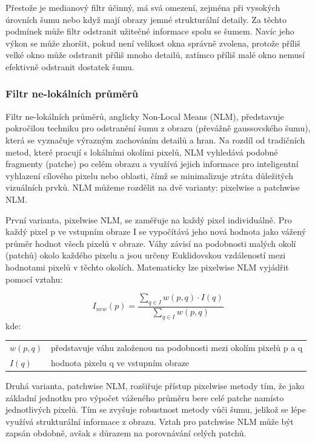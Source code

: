 \documentclass[male,czech,api_ing]{thesis}
\makeatletter
\newenvironment{conditions}[1][kde:]
    {#1 \begin{tabular}[t]{>{$}l<{$} @{${}={}$} >{\raggedright\arraybackslash}p{10cm}}}
    {\end{tabular}}
\makeatother
\begin{document}
Přestože je medianový filtr účinný, má svá omezení, zejména při vysokých úrovních šumu nebo když mají obrazy jemné strukturální detaily. Za těchto podmínek může filtr odstranit užitečné informace spolu se šumem. Navíc jeho výkon se může zhoršit, pokud není velikost okna správně zvolena, protože příliš velké okno může odstranit příliš mnoho detailů, zatímco příliš malé okno nemusí efektivně odstranit dostatek šumu.

\subsubsection{Filtr ne-lokálních průměrů}
Filtr ne-lokálních průměrů, anglicky Non-Local Means (NLM), představuje pokročilou techniku pro odstranění šumu z obrazu (převážně gaussovského šumu), která se vyznačuje výrazným zachováním detailů a hran. Na rozdíl od tradičních metod, které pracují s lokálními okolími pixelů, NLM vyhledává podobné fragmenty (patche) po celém obrazu a využívá jejich informace pro inteligentní vyhlazení cílového pixelu nebo oblasti, čímž se minimalizuje ztráta důležitých vizuálních prvků. NLM můžeme rozdělit na dvě varianty: pixelwise a patchwise NLM.

První varianta, pixelwise NLM, se zaměřuje na každý pixel individuálně. Pro každý pixel p ve vstupním obraze 
I se vypočítává jeho nová hodnota jako vážený průměr hodnot všech pixelů v obraze. Váhy závisí na podobnosti malých okolí (patchů) okolo každého pixelu a jsou určeny Euklidovskou vzdáleností mezi hodnotami pixelů v těchto okolích. Matematicky lze pixelwise NLM vyjádřit pomocí vztahu:

\begin{equation}
    I_{new}(p) = \frac{\sum_{q \in I} w(p,q) \cdot I(q)}{\sum_{q \in I} w(p,q)}
\end{equation}
\begin{conditions}
    w(p,q) & představuje váhu založenou na podobnosti mezi okolím pixelů p a q \\
    I(q) & hodnota pixelu q ve vstupním obraze
\end{conditions}

Druhá varianta, patchwise NLM, rozšiřuje přístup pixelwise metody tím, že jako základní jednotku pro výpočet váženého průměru bere celé patche namísto jednotlivých pixelů. Tím se zvyšuje robustnost metody vůči šumu, jelikož se lépe využívá strukturální informace z obrazu. Vztah pro patchwise NLM může být zapsán obdobně, avšak s důrazem na porovnávání celých patchů.
\end{document}
